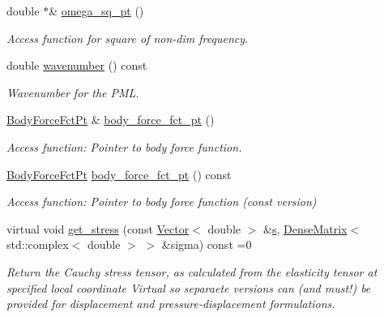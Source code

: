 \begin{DoxyCompactItemize}
double $\ast$\& \hyperlink{classoomph_1_1PMLTimeHarmonicLinearElasticityEquationsBase_a36c27a51c1f3d5bc18de259ba64a491f}{omega\+\_\+sq\+\_\+pt} ()
\begin{DoxyCompactList}\small\item\em Access function for square of non-\/dim frequency. \end{DoxyCompactList}\item 
double \hyperlink{classoomph_1_1PMLTimeHarmonicLinearElasticityEquationsBase_ad8fefedb08d09d81b8274c537dc342a6}{wavenumber} () const
\begin{DoxyCompactList}\small\item\em Wavenumber for the P\+ML. \end{DoxyCompactList}\item 
\hyperlink{classoomph_1_1PMLTimeHarmonicLinearElasticityEquationsBase_a04218d2a825726c0cd6b975d1ecd2f12}{Body\+Force\+Fct\+Pt} \& \hyperlink{classoomph_1_1PMLTimeHarmonicLinearElasticityEquationsBase_a4566baf06551ace30e548bd2b65a546f}{body\+\_\+force\+\_\+fct\+\_\+pt} ()
\begin{DoxyCompactList}\small\item\em Access function\+: Pointer to body force function. \end{DoxyCompactList}\item 
\hyperlink{classoomph_1_1PMLTimeHarmonicLinearElasticityEquationsBase_a04218d2a825726c0cd6b975d1ecd2f12}{Body\+Force\+Fct\+Pt} \hyperlink{classoomph_1_1PMLTimeHarmonicLinearElasticityEquationsBase_a3f89857500ed46f943e29f48472d5fc5}{body\+\_\+force\+\_\+fct\+\_\+pt} () const
\begin{DoxyCompactList}\small\item\em Access function\+: Pointer to body force function (const version) \end{DoxyCompactList}\item 
virtual void \hyperlink{classoomph_1_1PMLTimeHarmonicLinearElasticityEquationsBase_aed04505f397800718225e3d6c1bbee80}{get\+\_\+stress} (const \hyperlink{classoomph_1_1Vector}{Vector}$<$ double $>$ \&\hyperlink{cfortran_8h_ab7123126e4885ef647dd9c6e3807a21c}{s}, \hyperlink{classoomph_1_1DenseMatrix}{Dense\+Matrix}$<$ std\+::complex$<$ double $>$ $>$ \&sigma) const =0
\begin{DoxyCompactList}\small\item\em Return the Cauchy stress tensor, as calculated from the elasticity tensor at specified local coordinate Virtual so separaete versions can (and must!) be provided for displacement and pressure-\/displacement formulations. \end{DoxyCompactList}\item 

\end{DoxyCompactItemize}
